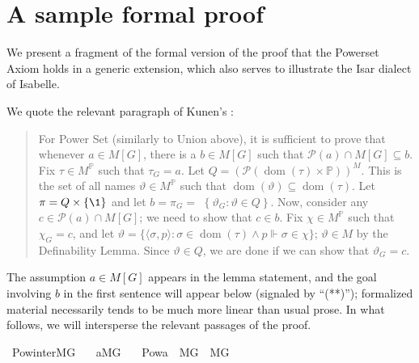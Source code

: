 \section{A sample formal proof}
\label{sec:sample-formal-proof}

We present a fragment of the formal version of the proof that the
Powerset Axiom holds in a generic extension, which also serves to
illustrate the Isar dialect of Isabelle.

We quote the relevant
paragraph of Kunen's \cite[Thm.~IV.2.27]{kunen2011set}:
\begin{quote}
  For Power Set (similarly to Union above), it is sufficient to prove
  that whenever $a \in M[G]$, there is a $b \in M[G]$ such that
  $\mathcal{P}(a) \cap M[G] \subseteq b$. Fix $\tau \in
  M^{\mathbb{P}}$ such that $\tau_{G}=a$. Let
  $Q=(\mathcal{P}(\operatorname{dom}(\tau) \times
  \mathbb{P}))^{M}$. This is the set of all names $\vartheta \in
  M^{\mathbb{P}}$ such that $\operatorname{dom}(\vartheta) \subseteq
  \operatorname{dom}(\tau)$. Let $\pi=Q \times\{\1\}$ and let
  $b=\pi_{G}=$ $\left\{\vartheta_{G}: \vartheta \in Q\right\}$. Now,
  consider any $c \in \mathcal{P}(a) \cap M[G]$; we need to show that
  $c \in b$. Fix $\chi \in M^{\mathbb{P}}$ such that
  $\chi_{G}=c$, and let $\vartheta=\{\langle\sigma, p\rangle:
  \sigma \in \operatorname{dom}(\tau) \wedge p \Vdash \sigma \in
  \chi\}$; $\vartheta \in M$ by the Definability Lemma. Since
  $\vartheta \in Q$, we are done if we can show that
  $\vartheta_{G}=c$.
\end{quote}
The assumption $a\in M[G]$ appears in the lemma statement, and the
goal involving $b$ in the first sentence will appear below (signaled
by “{\small (**)}”); formalized
material necessarily tends to be much more linear than usual prose. In
what follows, we
will intersperse the relevant passages of the proof.
\begin{isabelle}
\isamarkupfalse%
\ Pow{\isacharunderscore}{\kern0pt}inter{\isacharunderscore}{\kern0pt}MG{\isacharcolon}{\kern0pt}\isanewline
\ \ \ {\isachardoublequoteopen}a{\isasymin}M{\isacharbrackleft}{\kern0pt}G{\isacharbrackright}{\kern0pt}{\isachardoublequoteclose}\isanewline
\ \ \ {\isachardoublequoteopen}Pow{\isacharparenleft}{\kern0pt}a{\isacharparenright}{\kern0pt}\ {\isasyminter}\ M{\isacharbrackleft}{\kern0pt}G{\isacharbrackright}{\kern0pt}\ {\isasymin}\ M{\isacharbrackleft}{\kern0pt}G{\isacharbrackright}{\kern0pt}{\isachardoublequoteclose}\isanewline
%
\isamarkupfalse%
\ {\isacharminus}{\kern0pt}
\end{isabelle}

